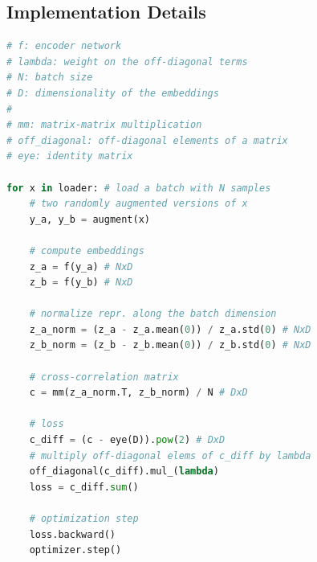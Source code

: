 







\subsection{Implementation Details}
\label{sec:implementation_details}

\begin{algorithm}[tb]
   \caption{PyTorch-style pseudocode for Barlow Twins.}
   \label{alg:barlow_twins}
   
\begin{lstlisting}[language=python]
# f: encoder network
# lambda: weight on the off-diagonal terms
# N: batch size
# D: dimensionality of the embeddings
#
# mm: matrix-matrix multiplication
# off_diagonal: off-diagonal elements of a matrix
# eye: identity matrix

for x in loader: # load a batch with N samples
    # two randomly augmented versions of x
    y_a, y_b = augment(x)
    
    # compute embeddings
    z_a = f(y_a) # NxD
    z_b = f(y_b) # NxD
    
    # normalize repr. along the batch dimension
    z_a_norm = (z_a - z_a.mean(0)) / z_a.std(0) # NxD
    z_b_norm = (z_b - z_b.mean(0)) / z_b.std(0) # NxD
    
    # cross-correlation matrix
    c = mm(z_a_norm.T, z_b_norm) / N # DxD
    
    # loss
    c_diff = (c - eye(D)).pow(2) # DxD
    # multiply off-diagonal elems of c_diff by lambda
    off_diagonal(c_diff).mul_(lambda)
    loss = c_diff.sum()

    # optimization step
    loss.backward()
    optimizer.step()
\end{lstlisting}
\end{algorithm}



